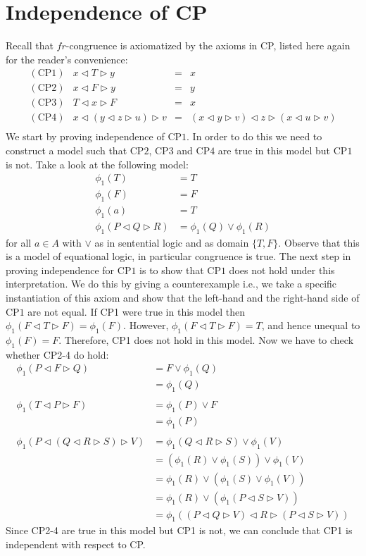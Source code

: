 \documentclass[a4paper,twoside,openright]{report}
\newcommand{\CP}[1]{\ensuremath{\mathrm{CP#1}}}
\newcommand{\lef}{\ensuremath{\triangleleft}}
\newcommand{\rig}{\ensuremath{\triangleright}}
\begin{document}
\section{Independence of CP}
Recall that $fr$-congruence is axiomatized by the axioms in CP, listed here again for the reader's convenience:
\[
\begin{array}{lrcl}
(\CP1) & x\lef T\rig y & = & x\\
(\CP2) & x\lef F\rig y & = & y\\
(\CP3) & T\lef x\rig F & = & x\\
(\CP4) & x\lef(y\lef z\rig u)\rig v & = & (x\lef y\rig v)\lef z\rig(x\lef u\rig v)\\
\end{array}
\]
We start by proving independence of \CP1. In order to do this we need to construct a model such that \CP2, \CP3 and \CP4 are true in this model but \CP1 is not. Take a look at the following model:
\begin{align*}
\phi_1(T) &= T\\
\phi_1(F) &= F\\
\phi_1(a) &= T\\
\phi_1(P\lef Q\rig R) &= \phi_1(Q)\vee\phi_1(R)
\end{align*}
for all $a\in A$ with $\vee$ as in sentential logic and as domain $\{T,F\}$. Observe that this is a model of equational logic, in particular congruence is true. The next step in proving independence for \CP1 is to show that \CP1 does not hold under this interpretation. We do this by giving a counterexample i.e., we take a specific instantiation of this axiom and show that the left-hand and the right-hand side of \CP1 are not equal. If CP1 were true in this model then $\phi_1(F\lef T\rig F)=\phi_1(F)$. However, $\phi_1(F\lef T\rig F)=T$, and hence unequal to $\phi_1(F)=F$. Therefore, CP1 does not hold in this model. Now we have to check whether CP2-4 do hold:
\begin{align*}
\phi_1(P\lef F\rig Q) &= F\vee\phi_1(Q)\\
&= \phi_1(Q)\\\\
\phi_1(T\lef P\rig F) &= \phi_1(P)\vee F\\
&=\phi_1(P)\\\\
\phi_1(P\lef(Q\lef R\rig S)\rig V)
&= \phi_1(Q\lef R\rig S)\vee\phi_1(V)\\
&= (\phi_1(R)\vee\phi_1(S))\vee\phi_1(V)\\
&= \phi_1(R)\vee(\phi_1(S)\vee\phi_1(V))\\
&= \phi_1(R)\vee(\phi_1(P\lef S\rig V))\\
&= \phi_1((P\lef Q\rig V)\lef R\rig(P\lef S\rig V))
\end{align*}
Since CP2-4 are true in this model but CP1 is not, we can conclude that CP1 is independent with respect to CP.
\end{document}
